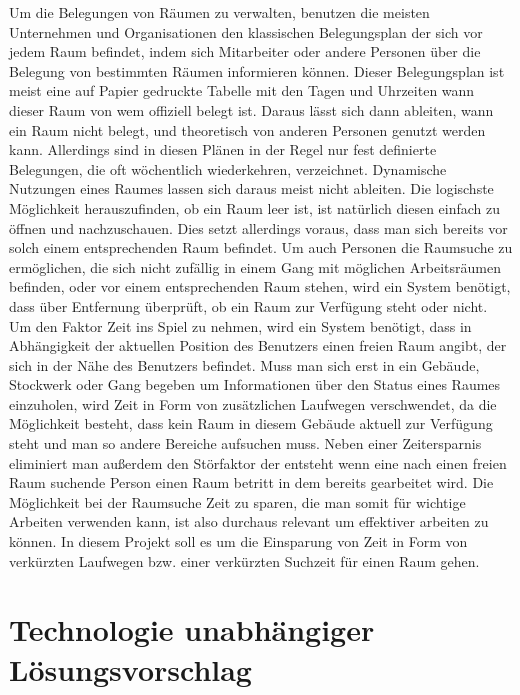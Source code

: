 Um die Belegungen von Räumen zu verwalten, benutzen die meisten Unternehmen und
Organisationen den klassischen Belegungsplan der sich vor jedem Raum befindet,
indem sich Mitarbeiter oder andere Personen über die Belegung von bestimmten
Räumen informieren können. Dieser Belegungsplan ist meist eine auf Papier
gedruckte Tabelle mit den Tagen und Uhrzeiten wann dieser Raum von wem
offiziell belegt ist. Daraus lässt sich dann ableiten, wann ein Raum nicht
belegt, und theoretisch von anderen Personen genutzt werden kann. Allerdings
sind in diesen Plänen in der Regel nur fest definierte Belegungen, die oft
wöchentlich wiederkehren, verzeichnet. Dynamische Nutzungen eines Raumes lassen
sich daraus meist nicht ableiten. Die logischste Möglichkeit herauszufinden, ob
ein Raum leer ist, ist natürlich diesen einfach zu öffnen und nachzuschauen.
Dies setzt allerdings voraus, dass man sich bereits vor solch einem
entsprechenden Raum befindet. Um auch Personen die Raumsuche zu ermöglichen,
die sich nicht zufällig in einem Gang mit möglichen Arbeitsräumen befinden,
oder vor einem entsprechenden Raum stehen, wird ein System benötigt, dass über
Entfernung überprüft, ob ein Raum zur Verfügung steht oder nicht. Um den Faktor
Zeit ins Spiel zu nehmen, wird ein System benötigt, dass in Abhängigkeit der
aktuellen Position des Benutzers einen freien Raum angibt, der sich in der Nähe
des Benutzers befindet. Muss man sich erst in ein Gebäude, Stockwerk oder Gang
begeben um Informationen über den Status eines Raumes einzuholen, wird Zeit in
Form von zusätzlichen Laufwegen verschwendet, da die Möglichkeit besteht, dass
kein Raum in diesem Gebäude aktuell zur Verfügung steht und man so andere
Bereiche aufsuchen muss. Neben einer Zeitersparnis eliminiert man außerdem den
Störfaktor der entsteht wenn eine nach einen freien Raum suchende Person einen
Raum betritt in dem bereits gearbeitet wird. Die Möglichkeit bei der Raumsuche
Zeit zu sparen, die man somit für wichtige Arbeiten verwenden kann, ist also
durchaus relevant um effektiver arbeiten zu können.   
In diesem Projekt soll es um die Einsparung von Zeit in Form von verkürzten
Laufwegen bzw. einer verkürzten Suchzeit für einen Raum gehen.


\section{Technologie unabhängiger Lösungsvorschlag}
\label{sec:Technologie unabhängiger Lösungsvorschlag}

